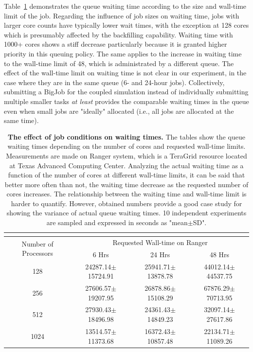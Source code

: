 \documentclass[preprint,12pt]{elsarticle}
\begin{document}
Table~\ref{table:WaitTime} demonstrates the queue waiting time according to the size and wall-time limit of the job. Regarding the influence of job sizes on waiting time, jobs with larger core counts have typically lower wait times, with the exception at 128 cores which is presumably affected by the backfilling capability. Waiting time with 1000+ cores shows a stiff decrease particularly because it is granted higher priority in this queuing policy. The same applies to the increase in waiting time to the wall-time limit of 48, which is administrated by a different queue. The effect of the wall-time limit on waiting time is not clear in our experiment, in the case where they are in the same queue (6- and 24-hour jobs). Collectively, submitting a BigJob for the coupled simulation instead of individually submitting multiple smaller tasks \textit{at least} provides the comparable waiting times in the queue even when small jobs are "ideally" allocated (i.e., all jobs are allocated at the same time).


\begin{table}
  \caption{\small {\bf The effect of job conditions on waiting times.}
The tables show the queue waiting times 
depending on the number of cores and requested wall-time limits.
Measurements are made on Ranger system,
which is a TeraGrid resource located at Texas Advanced Computing Center.
Analyzing the actual waiting time as a function of 
the number of cores at different wall-time limits, 
it can be said that better more often than not, 
the waiting time decrease as the requested number of cores increases. 
The relationship between the waiting time and wall-time limit is harder 
to quantify. However, obtained numbers provide a good case study 
for showing the variance of actual queue waiting times. 
10 independent experiments are sampled and expressed in seconds as "mean$\pm$SD".}
  \label{table:WaitTime}
  \centering
\footnotesize
  \begin{tabular}{c || c c c}
 \multicolumn{4}{c}{\phantom{\tiny 100}}\\
\hline
 \multirow{2}{0.15\textwidth}{Number of Processors} &
 \multicolumn{3}{c}{Requested Wall-time on Ranger} \\
\cline{2-4}
& 6 Hrs & 24 Hrs & 48 Hrs\\
\hline			
128  &  24287.14\scriptsize{$\pm$15724.91}  &  25941.71\scriptsize{$\pm$13878.78}  &  44012.14\scriptsize{$\pm$44537.75} \\
256  &  27606.57\scriptsize{$\pm$19207.95}  &  26878.86\scriptsize{$\pm$15108.29}  &  67876.29\scriptsize{$\pm$70713.95} \\
512  &  27930.43\scriptsize{$\pm$18496.98}  &  24361.43\scriptsize{$\pm$14849.23}  &  32097.14\scriptsize{$\pm$27617.86} \\
1024  &  13514.57\scriptsize{$\pm$11373.68}  &  16372.43\scriptsize{$\pm$10857.48}  &  22134.71\scriptsize{$\pm$11089.26} \\

\hline
\end{tabular} %
\vspace{-1em}
\end{table}
\end{document}
